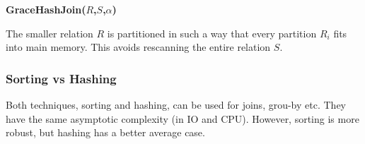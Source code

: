 \begin{algorithm}
\caption*{\bf GraceHashJoin($R$,$S$,$\alpha$)}
\begin{algorithmic}
\ENDFOR
{}
\ENDFOR
{}
	\ENDFOR
\ENDFOR
\end{algorithmic}
\end{algorithm}

\begin{note}
The smaller relation $R$ is partitioned in such a way that every partition $R_i$ fits into main memory. This avoids rescanning the entire relation $S$.
\end{note}




\subsubsection{Sorting vs Hashing}

Both techniques, sorting and hashing, can be used for joins, grou-by etc. They have the same asymptotic complexity (in IO and CPU). However, sorting is more robust, but hashing has a better average case.


